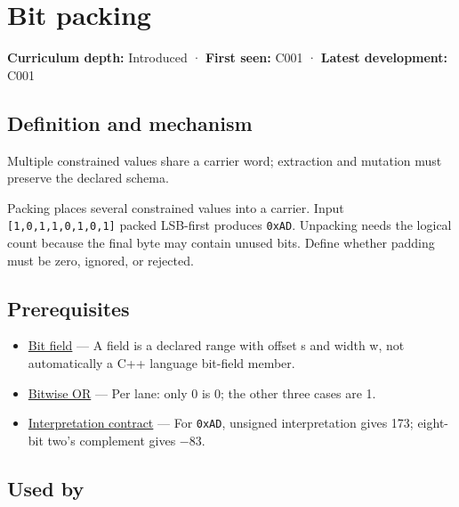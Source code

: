 \hypertarget{appendix-1f9963e1a5d1}{}\label{referencestart:appendix-1f9963e1a5d1}
\section{Bit packing}\label{appendix-1f9963e1a5d1-bit-packing}

\textbf{Curriculum depth:} Introduced · \textbf{First seen:} C001 · \textbf{Latest development:} C001

\begin{allmightroledefinition}

\subsection{Definition and mechanism}\label{appendix-1f9963e1a5d1-definition-and-mechanism}

Multiple constrained values share a carrier word; extraction and mutation must preserve the declared schema.

\end{allmightroledefinition}

Packing places several constrained values into a carrier. Input \texttt{{[}1,0,1,1,0,1,0,1{]}} packed LSB-first produces \texttt{0xAD}. Unpacking needs the logical count because the final byte may contain unused bits. Define whether padding must be zero, ignored, or rejected.

\subsection{Prerequisites}\label{appendix-1f9963e1a5d1-prerequisites}

\begin{itemize}
\tightlist
\item
  \hyperref[appendix-ac697f5c66e8]{Bit field} --- A field is a declared range with offset s and width w, not automatically a C++ language bit-field member.
\item
  \hyperref[appendix-a427ce8ce8a6]{Bitwise OR} --- Per lane: only 0 is 0; the other three cases are 1.
\item
  \hyperref[appendix-f414bd4ed05c]{Interpretation contract} --- For \texttt{0xAD}, unsigned interpretation gives 173; eight-bit two's complement gives −83.
\end{itemize}

\subsection{Used by}\label{appendix-1f9963e1a5d1-used-by}

